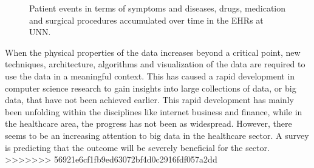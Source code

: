 \begin{figure}[]
\begin{center}
\end{center}
\caption{Patient events in terms of symptoms and diseases, drugs, medication and surgical procedures  accumulated over time in the EHRs at UNN.\cite{freetext}}\label{fig:ackseq}
\end{figure}
When the physical properties of the data increases beyond a critical point, new techniques, architecture, algorithms and visualization of the data are required to use the data in a meaningful context. This has caused a rapid development in computer science research to gain insights into large collections of data, or big data, that have not been achieved earlier. This rapid development has mainly been unfolding within the disciplines like internet business and finance, while in the healthcare area, the progress has not been as widespread. However, there seems to be an increasing attention to big data in the healthcare sector. A survey is predicting that the outcome will be severely beneficial for the sector.\cite{gg}
>>>>>>> 56921e6cf1fb9ed63072bf4d0c2916fdf057a2dd


